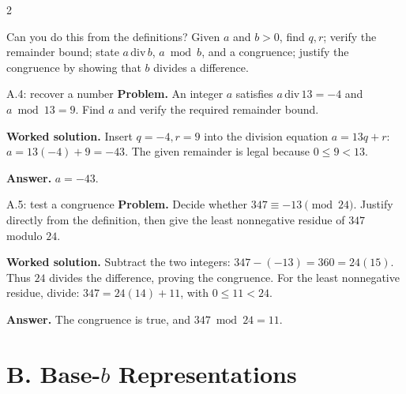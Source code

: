 \documentclass[10pt]{article}
\begin{document}
\begin{multicols}{2}
\begin{checklistbox}{Can you do this from the definitions?}
Given $a$ and $b>0$, find $q,r$; verify the remainder bound; state
$a\,\mathrm{div}\,b$, $a\bmod b$, and a congruence; justify the congruence by
showing that $b$ divides a difference.
\end{checklistbox}

\begin{workedbox}{A.4: recover a number}
\textbf{Problem.} An integer $a$ satisfies $a\,\mathrm{div}\,13=-4$ and $a\bmod13=9$. Find $a$ and verify the required remainder bound.

\textbf{Worked solution.} Insert $q=-4,r=9$ into the division equation $a=13q+r$: $a=13(-4)+9=-43$. The given remainder is legal because $0\le9<13$.

\textbf{Answer.} $a=-43$.
\end{workedbox}

\begin{workedbox}{A.5: test a congruence}
\textbf{Problem.} Decide whether $347\equiv-13\pmod{24}$. Justify directly from the definition, then give the least nonnegative residue of $347$ modulo $24$.

\textbf{Worked solution.} Subtract the two integers: $347-(-13)=360=24(15)$. Thus $24$ divides the difference, proving the congruence. For the least nonnegative residue, divide: $347=24(14)+11$, with $0\le11<24$.

\textbf{Answer.} The congruence is true, and $347\bmod24=11$.
\end{workedbox}
\end{multicols}

\thispagestyle{fancy}
\pagestyle{fancy}
\thispagestyle{fancy}
\section*{B. Base-$b$ Representations}
\thispagestyle{fancy}
\end{document}
